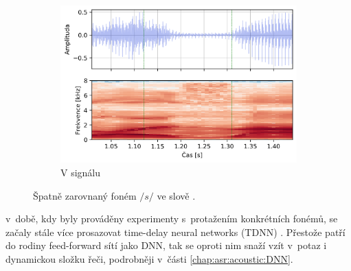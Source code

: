 \begin{figure}[htpb]
\begin{subfigure}[b]{0.65\textwidth}
    \includegraphics[width=\textwidth]{./ch6-realisation/img/energy_spec_word-segment.png}
    \caption{V signálu}
    \label{fig:realisation:augmentation:alignemnt:wrong:audio}
  \end{subfigure}
  \caption{Špatně zarovnaný foném $/s/$ ve slově .}
  \label{fig:realisation:augmentation:alignemnt:wrong}
\end{figure}


\noindent v~době, kdy byly prováděny experimenty s~protažením konkrétních fonémů, se začaly stále více prosazovat time-delay neural networks (TDNN) .
Přestože patří do rodiny feed-forward sítí jako DNN, tak se oproti nim snaží vzít v~potaz i dynamickou složku řeči, podrobněji v~části \ref{chap:asr:acoustic:DNN}.


